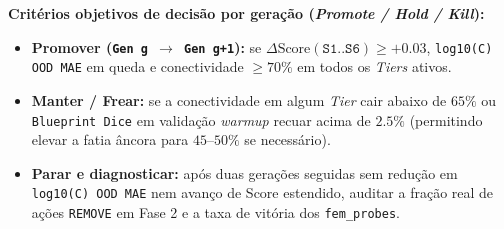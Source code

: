 \documentclass[11pt,a4paper]{article}
\begin{document}
\begin{table}[htbp]
\centering
\caption{Projeções quantitativas Stage 6 (\texttt{S1..S6}) e marcos esperados por geração.}
\label{tab:projections}
\end{table}

\textbf{Critérios objetivos de decisão por geração (\emph{Promote / Hold / Kill}):}
\begin{itemize}
\item \textbf{Promover (\texttt{Gen g $\to$ Gen g+1}):} se $\Delta\text{Score}(\texttt{S1..S6}) \ge +0.03$, \texttt{log10(C) OOD MAE} em queda e conectividade $\ge 70\%$ em todos os \emph{Tiers} ativos.
\item \textbf{Manter / Frear:} se a conectividade em algum \emph{Tier} cair abaixo de $65\%$ ou \texttt{Blueprint Dice} em validação \emph{warmup} recuar acima de $2.5\%$ (permitindo elevar a fatia âncora para $45\text{--}50\%$ se necessário).
\item \textbf{Parar e diagnosticar:} após duas gerações seguidas sem redução em \texttt{log10(C) OOD MAE} nem avanço de Score estendido, auditar a fração real de ações \texttt{REMOVE} em Fase 2 e a taxa de vitória dos \texttt{fem\_probes}.
\end{itemize}
\end{document}
